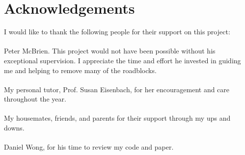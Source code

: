 \cleardoublepage
{}
{}
\chapter*{Acknowledgements}
\vspace{1.0in}
I would like to thank the following people for their support on this project:\\
\\
Peter McBrien. This project would not have been possible without his exceptional supervision. I appreciate the time and effort he invested in guiding me and helping to remove many of the roadblocks.\\
\\
My personal tutor, Prof. Susan Eisenbach, for her encouragement and care throughout the year.\\
\\
My housemates, friends, and parents for their support through my ups and downs. \\
\\
Daniel Wong, for his time to review my code and paper.\\
\\
\\
\\
\\
\\
\newpage
